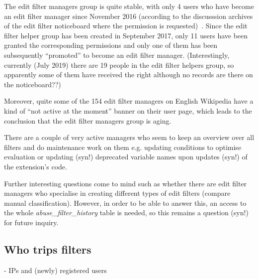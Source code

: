 The edit filter managers group is quite stable, with only 4 users who have become an edit filter manager since November 2016 (according to the discusssion archives of the edit filter noticeboard where the permission is requested)~\cite{}.
Since the edit filter helper group has been created in September 2017, only 11 users have been granted the corresponding permissions and only one of them has been subsequently ``promoted'' to become an edit filter manager.
(Interestingly, currently (July 2019) there are 19 people in the edit filter helpers group, so apparently some of them have received the right although no records are there on the noticeboard??)

Moreover, quite some of the 154 edit filter managers on English Wikipedia have a kind of ``not active at the moment'' banner on their user page, which leads to the conclusion that the edit filter managers group is aging.


There are a couple of very active managers who seem to keep an overview over all filters and do maintenance work on them e.g. updating conditions to optimise evaluation or updating (syn!) deprecated variable names upon updates (syn!) of the extension's code.

Further interesting questions come to mind such as whether there are edit filter managers who specialise in creating different types of edit filters (compare manual classification).
However, in order to be able to answer this, an access to the whole \emph{abuse\_filter\_history} table is needed, so this remains a question (syn!) for future inquiry.

\subsection{Who trips filters}

- IPs and (newly) registered users

